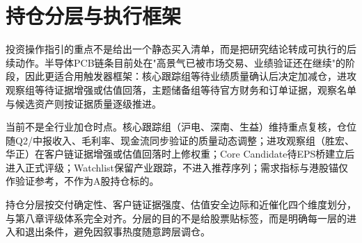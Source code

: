 \section{持仓分层与执行框架}

投资操作指引的重点不是给出一个静态买入清单，而是把研究结论转成可执行的后续动作。半导体PCB链条目前处在"高景气已被市场交易、业绩验证还在继续"的阶段，因此更适合用触发器框架：核心跟踪组等待业绩质量确认后决定加减仓，进攻观察组等待证据增强或估值回落，主题储备组等待官方财务和订单证据，观察名单与候选资产则按证据质量逐级推进。

\begin{keyinsight}[核心操作结论]
当前不是全行业加仓时点。核心跟踪组（沪电、深南、生益）维持重点复核，仓位随Q2/中报收入、毛利率、现金流同步验证的质量动态调整；进攻观察组（胜宏、华正）在客户链证据增强或估值回落时上修权重；Core Candidate待EPS桥建立后进入正式评级；Watchlist保留产业跟踪，不进入推荐序列；需求指标与港股锚仅作验证参考，不作为A股持仓标的。
\end{keyinsight}

持仓分层按交付确定性、客户链证据强度、估值安全边际和近催化四个维度划分，与第八章评级体系完全对齐。分层的目的不是给股票贴标签，而是明确每一层的进入和退出条件，避免因叙事热度随意跨层调仓。

